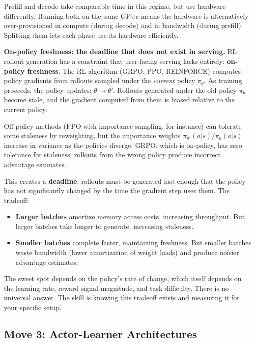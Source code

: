 Prefill and decode take comparable time in this regime, but use hardware differently. Running both on the same GPUs means the hardware is alternatively over-provisioned in compute (during decode) and in bandwidth (during prefill). Splitting them lets each phase use its hardware efficiently.

\textbf{On-policy freshness: the deadline that does not exist in serving.} RL rollout generation has a constraint that user-facing serving lacks entirely: \textbf{on-policy freshness}. The RL algorithm (GRPO, PPO, REINFORCE) computes policy gradients from rollouts sampled under the \textit{current} policy $\pi_\theta$. As training proceeds, the policy updates: $\theta \to \theta'$. Rollouts generated under the old policy $\pi_\theta$ become stale, and the gradient computed from them is biased relative to the current policy.

Off-policy methods (PPO with importance sampling, for instance) can tolerate some staleness by reweighting, but the importance weights $\pi_{\theta'}(a|s) / \pi_\theta(a|s)$ increase in variance as the policies diverge. GRPO, which is on-policy, has zero tolerance for staleness: rollouts from the wrong policy produce incorrect advantage estimates.

This creates a \textbf{deadline}: rollouts must be generated fast enough that the policy has not significantly changed by the time the gradient step uses them. The tradeoff:

\begin{itemize}
  \item \textbf{Larger batches} amortize memory access costs, increasing throughput. But larger batches take longer to generate, increasing staleness.
  \item \textbf{Smaller batches} complete faster, maintaining freshness. But smaller batches waste bandwidth (lower amortization of weight loads) and produce noisier advantage estimates.
\end{itemize}

The sweet spot depends on the policy's rate of change, which itself depends on the learning rate, reward signal magnitude, and task difficulty. There is no universal answer. The skill is knowing this tradeoff exists and measuring it for your specific setup.

\subsection*{Move 3: Actor-Learner Architectures}

